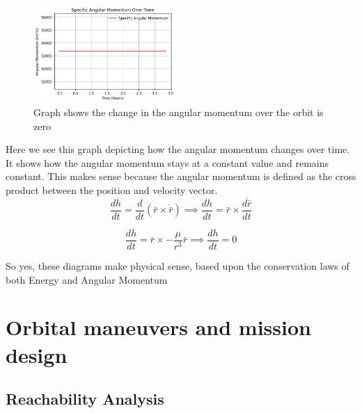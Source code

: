 \documentclass[12pt,twocolumn]{article}  %
\begin{document}
\begin{figure}[H]
    \centering
    \includegraphics[width=0.48\textwidth]{Images/124-L.png}
    \caption{Graph shows the change in the angular momentum over the orbit is zero}
\end{figure}
\noindent Here we see this graph depicting how the angular momentum changes over time. It shows how the angular momentum stays 
at a constant value and remains constant. This makes sense because the angular momentum is defined as the cross product
between the position and velocity vector.
\setcounter{equation}{0}
\begin{equation}
\frac{dh}{dt} = \frac{d}{dt}(\bar{r} \times \dot{\bar{r}}) \implies \frac{dh}{dt} = \bar{r} \times \frac{d\dot{\bar{r}}}{dt}
\end{equation}

\begin{equation}
\frac{dh}{dt} = \bar{r} \times -\frac{\mu}{r^{3}}\bar{r} \implies \frac{dh}{dt} = 0
\end{equation}
\vspace{0.2cm}

So yes, these diagrams make physical sense, based upon the conservation laws of both Energy and Angular Momentum


\section{Orbital maneuvers and mission design}
\subsection{Reachability Analysis}
\end{document}
